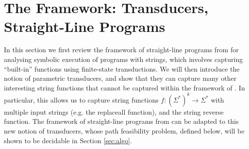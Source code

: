 
\section{The Framework: Transducers, Straight-Line Programs}
\label{sec:framework}

In this section we first review the framework of straight-line programs from
\cite{LB16} for analysing symbolic execution of programs with strings, which
involves capturing ``built-in'' functions using finite-state transductions.
We will then introduce the notion of parametric transducers, and show that
they can capture many other interesting string functions that cannot be captured
within the framework of \cite{LB16}. In particular, this allows us to capture
string functions $f: (\Sigma^*)^k \to \Sigma^*$ with multiple input strings
(e.g. the replaceall function), and the string reverse function. 
The framework of straight-line programs from \cite{LB16} can be adapted
to this new notion of transducers, whose path feasibility problem, defined below, will be shown
to be decidable in Section \ref{sec:algo}.



